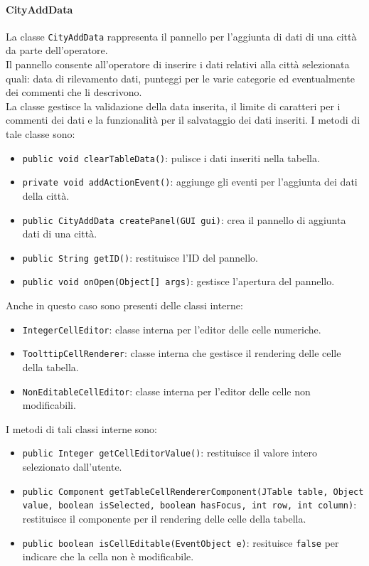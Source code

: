 \paragraph{CityAddData}
La classe \texttt{CityAddData} rappresenta il pannello per l'aggiunta di dati di una città da parte dell'operatore.\\
Il pannello consente all'operatore di inserire i dati relativi alla città selezionata quali: data di rilevamento dati, punteggi per le varie categorie ed eventualmente dei commenti che li descrivono.\\
La classe gestisce la validazione della data inserita, il limite di caratteri per i commenti dei dati e la funzionalità per il salvataggio dei dati inseriti. 
I metodi di tale classe sono:
\begin{itemize}
    \item \texttt{public void clearTableData()}: pulisce i dati inseriti nella tabella.
    \item \texttt{private void addActionEvent()}: aggiunge gli eventi per l'aggiunta dei dati della città.
    \item \texttt{public CityAddData createPanel(GUI gui)}: crea il pannello di aggiunta dati di una città.
    \item \texttt{public String getID()}: restituisce l'ID del pannello.
    \item \texttt{public void onOpen(Object[] args)}: gestisce l'apertura del pannello.
\end{itemize}
Anche in questo caso sono presenti delle classi interne:
\begin{itemize}
    \item \texttt{IntegerCellEditor}: classe interna per l'editor delle celle numeriche.
    \item \texttt{ToolttipCellRenderer}: classe interna che gestisce il rendering delle celle della tabella.
    \item \texttt{NonEditableCellEditor}: classe interna per l'editor delle celle non modificabili.
\end{itemize}
I metodi di tali classi interne sono:
\begin{itemize}
    \item \texttt{public Integer getCellEditorValue()}: restituisce il valore intero selezionato dall'utente.
    \item \texttt{public Component getTableCellRendererComponent(JTable table, Object value, boolean isSelected, boolean hasFocus, int row, int column)}: restituisce il componente per il rendering delle celle della tabella.
    \item \texttt{public boolean isCellEditable(EventObject e)}: resituisce \texttt{false} per indicare che la cella non è modificabile.
\end{itemize}